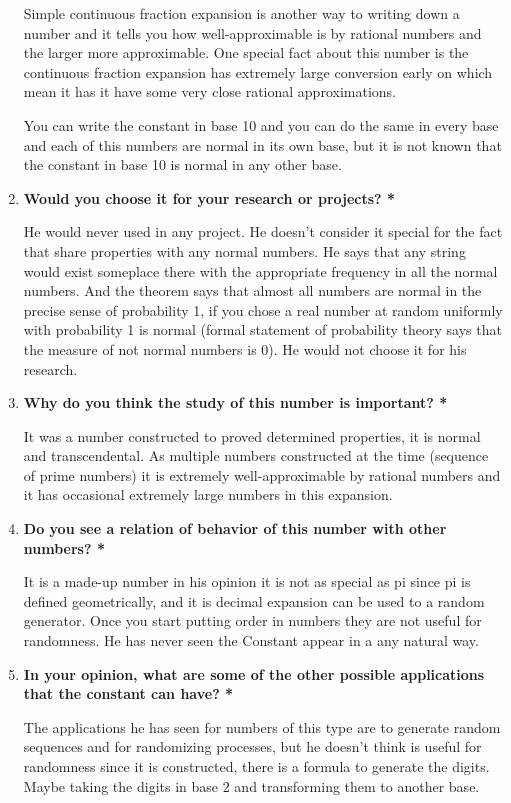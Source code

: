 \documentclass{article}
\begin{document}
\begin{enumerate}
Simple continuous fraction expansion is another way to writing down a number and it tells you how well-approximable is by rational numbers and the larger more approximable. One special fact about this number is the continuous fraction expansion has extremely large conversion early on which mean it has it have some very close rational approximations.

You can write the constant in base 10 and you can do the same in every base and each of this numbers are normal in its own base, but it is not known that the constant in base 10 is normal in any other base.

\item\textbf{Would you choose it for your research or projects?\color{red} *}

He would never used in any project. He doesn’t consider it special for the fact that share properties with any normal numbers. He says that any string would exist someplace there with the appropriate frequency in all the normal numbers. And the theorem says that almost all numbers are normal in the precise sense of probability 1, if you chose a real number at random uniformly with probability 1 is normal (formal statement of probability theory says that the measure of not normal numbers is 0). He would not choose it for his research.

\item\textbf{Why do you think the study of this number is important?\color{red} *}

It was a number constructed to proved determined properties, it is normal and transcendental. As multiple numbers constructed at the time (sequence of prime numbers) it is extremely well-approximable by rational numbers and it has occasional extremely large numbers in this expansion.

\item\textbf{Do you see a relation of behavior of this number with other numbers?\color{red} *}

It is a made-up number in his opinion it is not as special as pi since pi is defined geometrically, and it is decimal expansion can be used to a random generator. Once you start putting order in numbers they are not useful for randomness. He has never seen the Constant appear in a any natural way.  

\item\textbf{In your opinion, what are some of the other possible applications that the constant can have?\color{red} *}

The applications he has seen for numbers of this type are to generate random sequences and for randomizing processes, but he doesn’t think is useful for randomness since it is constructed, there is a formula to generate the digits. Maybe taking the digits in base 2 and transforming them to another base.


\end{enumerate}
\end{document}
